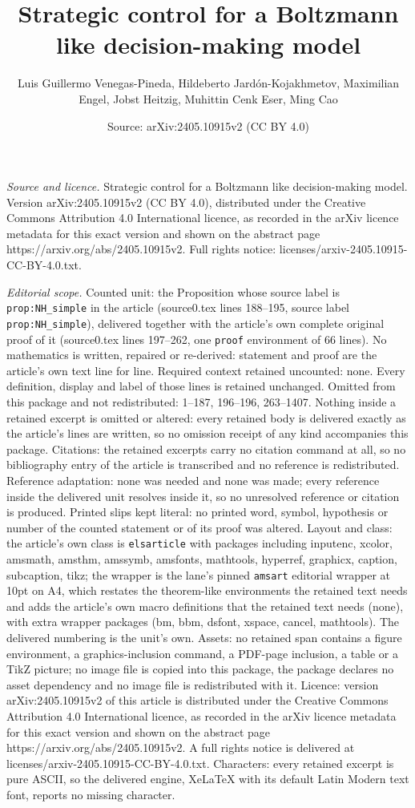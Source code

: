 \documentclass[10pt,a4paper]{amsart}
\title[Strategic control for a Boltzmann like decision-making model]{Strategic control for a Boltzmann like decision-making model}
\author{Luis Guillermo Venegas-Pineda, Hildeberto Jard\'on-Kojakhmetov, Maximilian Engel, Jobst Heitzig, Muhittin Cenk Eser, Ming Cao}
\date{Source: arXiv:2405.10915v2 (CC BY 4.0)}
\begin{document}
\maketitle

\noindent\emph{Source and licence.} Strategic control for a Boltzmann like decision-making model. Version arXiv:2405.10915v2 (CC BY 4.0), distributed under the Creative Commons Attribution 4.0 International licence, as recorded in the arXiv licence metadata for this exact version and shown on the abstract page https://arxiv.org/abs/2405.10915v2. Full rights notice: licenses/arxiv-2405.10915-CC-BY-4.0.txt.\par\smallskip

\noindent\textit{Editorial scope.} Counted unit: the Proposition whose source label is \texttt{prop:NH\_simple} in the article (source0.tex lines 188--195, source label \texttt{prop:NH\_simple}), delivered together with the article's own complete original proof of it (source0.tex lines 197--262, one \texttt{proof} environment of 66 lines). No mathematics is written, repaired or re-derived: statement and proof are the article's own text line for line. Required context retained uncounted: none. Every definition, display and label of those lines is retained unchanged. Omitted from this package and not redistributed: 1--187, 196--196, 263--1407. Nothing inside a retained excerpt is omitted or altered: every retained body is delivered exactly as the article's lines are written, so no omission receipt of any kind accompanies this package. Citations: the retained excerpts carry no citation command at all, so no bibliography entry of the article is transcribed and no reference is redistributed. Reference adaptation: none was needed and none was made; every reference inside the delivered unit resolves inside it, so no unresolved reference or citation is produced. Printed slips kept literal: no printed word, symbol, hypothesis or number of the counted statement or of its proof was altered. Layout and class: the article's own class is \texttt{elsarticle} with packages including inputenc, xcolor, amsmath, amsthm, amssymb, amsfonts, mathtools, hyperref, graphicx, caption, subcaption, tikz; the wrapper is the lane's pinned \texttt{amsart} editorial wrapper at 10pt on A4, which restates the theorem-like environments the retained text needs and adds the article's own macro definitions that the retained text needs (none), with extra wrapper packages (bm, bbm, dsfont, xspace, cancel, mathtools). The delivered numbering is the unit's own. Assets: no retained span contains a figure environment, a graphics-inclusion command, a PDF-page inclusion, a table or a TikZ picture; no image file is copied into this package, the package declares no asset dependency and no image file is redistributed with it. Licence: version arXiv:2405.10915v2 of this article is distributed under the Creative Commons Attribution 4.0 International licence, as recorded in the arXiv licence metadata for this exact version and shown on the abstract page https://arxiv.org/abs/2405.10915v2. A full rights notice is delivered at licenses/arxiv-2405.10915-CC-BY-4.0.txt. Characters: every retained excerpt is pure ASCII, so the delivered engine, XeLaTeX with its default Latin Modern text font, reports no missing character.
\end{document}
